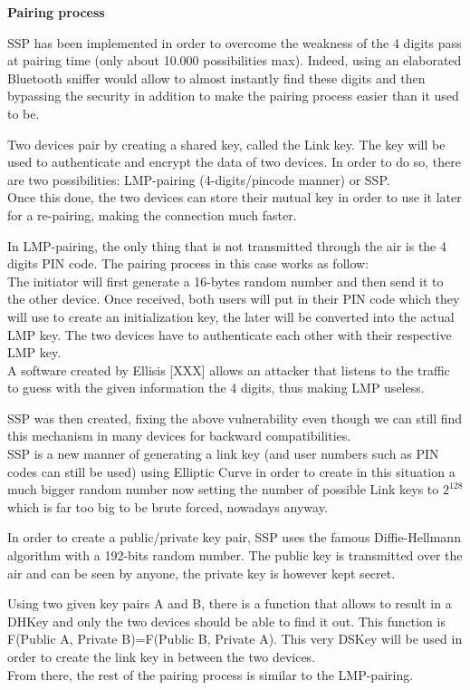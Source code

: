 \textbf{Pairing process}

SSP has been implemented in order to overcome the weakness of the 4 digits pass at pairing time (only about 10.000 possibilities max). Indeed, using an elaborated Bluetooth sniffer would allow to almost instantly find these digits and then bypassing the security in addition to make the pairing process easier than it used to be.
	
Two devices pair by creating a shared key, called the Link key. The key will be used to authenticate and encrypt the data of two devices.
In order to do so, there are two possibilities: LMP-pairing (4-digits/pincode manner) or SSP. \\
Once this done, the two devices can store their mutual key in order to use it later for a re-pairing, making the connection much faster.

In LMP-pairing, the only thing that is not transmitted through the air is the 4 digits PIN code. The pairing process in this case works as follow: \\
The initiator will first generate a 16-bytes random number and then send it to the other device. Once received, both users will put in their PIN code which they will use to create an initialization key, the later will be converted into the actual LMP key. The two devices have to authenticate each other with their respective LMP key. \\
A software created by Ellisis [XXX] allows an attacker that listens to the traffic to guess with the given information the 4 digits, thus making LMP useless. 

SSP was then created, fixing the above vulnerability even though we can still find this mechanism in many devices for backward compatibilities. \\
SSP is a new manner of generating a link key (and user numbers such as PIN codes can still be used) using Elliptic Curve in order to create in this situation a much bigger random number now setting the number of possible Link keys to \(2^{128}\) which is far too big to be brute forced, nowadays anyway. 

In order to create a public/private key pair, SSP uses the famous Diffie-Hellmann algorithm with a 192-bits random number. The public key is transmitted over the air and can be seen by anyone, the private key is however kept secret. 

Using two given key pairs A and B, there is a function that allows to result in a DHKey and only the two devices should be able to find it out. This function is F(Public A, Private B)=F(Public B, Private A). This very DSKey will be used in order to create the link key in between the two devices. \\ 
From there, the rest of the pairing process is similar to the LMP-pairing.


